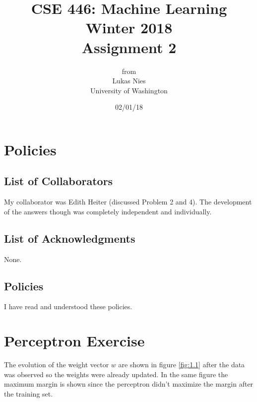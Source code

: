 \documentclass[12pt]{article}
\begin{document}
	
	\title{
		\textbf{\huge{CSE 446: Machine Learning Winter 2018 }} \\[2cm]
		\LARGE{Assignment 2}\\[1cm]
	}
	\author{from \\ Lukas Nies \\ University of Washington}
	\date{02/01/18}
	\clearpage\maketitle\thispagestyle{empty}
	\newpage

	\tableofcontents
	\setcounter{page}{0}
	\newpage
	
	\setcounter{section}{-1}
	

\section{Policies}

\subsection{List of Collaborators}

My collaborator was Edith Heiter (discussed Problem 2 and 4). The development of the answers though was completely independent and individually.

\subsection{List of Acknowledgments}

None.

\subsection{Policies}

I have read and understood these policies.

\section{Perceptron Exercise}

The evolution of the weight vector $w$ are shown in figure \ref{fig:1.1} after the data was observed so the weights were already updated. In the same figure the maximum margin is shown since the perceptron didn't maximize the margin after the training set.
\end{document}

